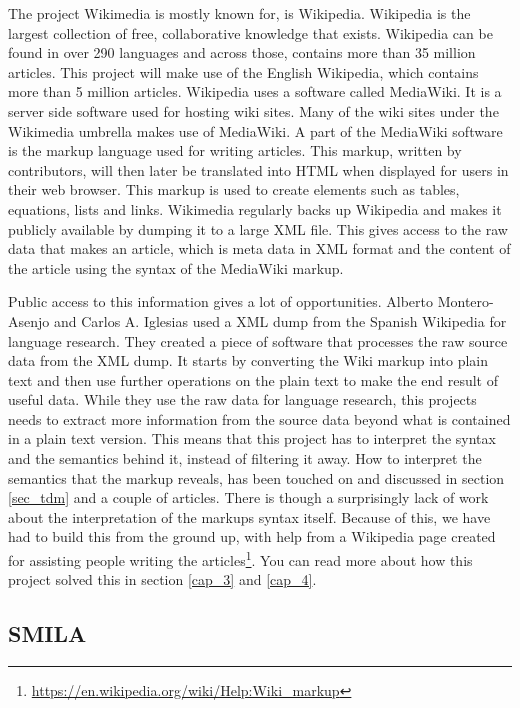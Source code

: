The project Wikimedia is mostly known for, is Wikipedia\cite{wikipedia}. Wikipedia is the largest collection of free, collaborative knowledge that exists. Wikipedia can be found in over 290 languages and across those, contains more than 35 million articles. This project will make use of the English Wikipedia, which contains more than 5 million articles. Wikipedia uses a  software called MediaWiki\cite{mediawiki}. It is a server side software used for hosting wiki sites. Many of the wiki sites under the Wikimedia umbrella makes use of MediaWiki. A part of the MediaWiki software is the markup language used for writing articles. This markup, written by contributors, will then later be translated into HTML when displayed for users in their web browser. This markup is used to create elements such as tables, equations, lists and links. Wikimedia regularly backs up Wikipedia and makes it publicly available by dumping it to a large XML file. This gives access to the raw data that makes an article, which is meta data in XML format and the content of the article using the syntax of the MediaWiki markup. 

Public access to this information gives a lot of opportunities. Alberto Montero-Asenjo and Carlos A. Iglesias used a XML dump from the Spanish Wikipedia for language research\cite{lr-wiki}. They created a piece of software that processes the raw source data from the XML dump. It starts by converting the Wiki markup into plain text and then use further operations on the plain text to make the end result of useful data. While they use the raw data for language research, this projects needs to extract more information from the source data beyond what is contained in a plain text version. This means that this project has to interpret the syntax and the semantics behind it, instead of filtering it away.
How to interpret the semantics that the markup reveals, has been touched on and discussed in section \ref{sec_tdm} and a couple of articles\cite{text-cat}\cite{wlm}. There is though a surprisingly lack of work about the interpretation of the markups syntax itself. Because of this, we have had to build this from the ground up, with help from a Wikipedia page created for assisting people writing the articles\footnote{\url{https://en.wikipedia.org/wiki/Help:Wiki_markup}}. You can read more about how this project solved this in section \ref{cap_3} and \ref{cap_4}.



\subsection{SMILA} \label{smila}

